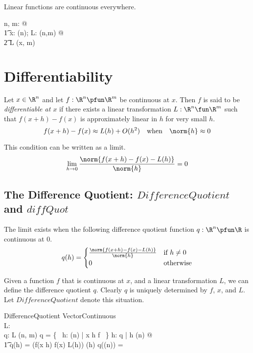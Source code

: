 \documentclass{amsart}
\begin{document}
\begin{theorem}
Linear functions are continuous everywhere.

\begin{zed}
	\forall n, m: \nat @ \\
	\t1	\forall x: \Rtup(n); L: \linRtup(n,m) @ \\
	\t2		L \in \CzeroPointRtupRtup(x, m)
\end{zed}

\end{theorem}


\section{Differentiability}

Let $x \in \R^n$ and let $f: \R^n \pfun \R^m$ be continuous at $x$.
Then $f$ is said to be {\it differentiable at $x$} if there exists a linear transformation $L: \R^n \fun \R^m$
such that $f(x + h) - f(x)$ is approximately linear in $h$ for very small $h$.
$$
f(x + h) - f(x) \approx  L(h) + O(h^2) \quad \text{when} \quad \norm{h} \approx 0
$$

This condition can be written as a limit.
$$
\lim_{h \to 0} \frac{\norm{f(x+h) - f(x) - L(h)}}{\norm{h}} = 0
$$

\subsection{The Difference Quotient: $DifferenceQuotient$ and $diffQuot$}

The limit exists when the following difference quotient function $q: \R^n \pfun \R$ is continuous at $0$.
$$
q(h) = 
\begin{cases}
	\frac{\norm{f(x+h) - f(x) - L(h)}}{\norm{h}}	&	\text{if } h \neq 0\\
	0								&	\text{otherwise}
\end{cases}
$$

Given a function $f$ that is continuous at $x$, and a linear transformation $L$,
we can define the difference quotient $q$.
Clearly $q$ is uniquely determined by $f$, $x$, and $L$.
Let $DifferenceQuotient$ denote this situation.

\begin{schema}{DifferenceQuotient}
	VectorContinuous \\
	L: \Rinf \pfun \Rinf \\
	q: \Rinf \pfun \R
\where
	L \in \linRtup(n, m)
\also
	\dom q = \{~ h: \Rtup(n) | x \addRinf h \in \dom f ~\}
\also
	\forall h: \dom q | h \neq \zeroRtup(n) @ \\
	\t1	q(h) = \normRinf(f(x \addRinf h) \subRinf f(x) \subRinf L(h)) \divR \normRinf(h)
\also
	q(\zeroRtup(n)) = \zeroR
\end{schema}
\end{document}
